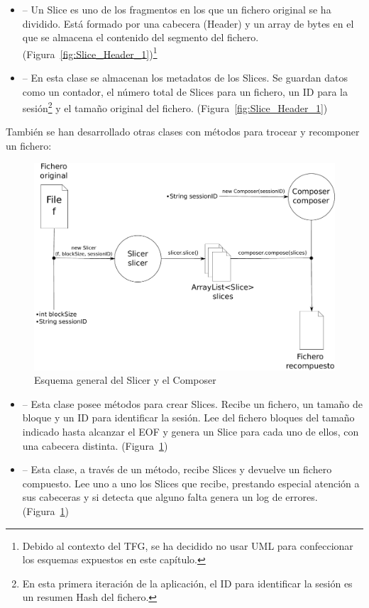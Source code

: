 \begin{itemize}
  \item {} -- Un Slice es uno de los fragmentos en los que un
  fichero original se ha dividido. Está formado por una cabecera (Header) y un
  array de bytes en el que se almacena el contenido del segmento del fichero.
  (Figura~\ref{fig:Slice_Header_1})\footnote{Debido al contexto del TFG, se ha
  decidido no usar UML para confeccionar los esquemas expuestos en este
  capítulo.}

  \item {} -- En esta clase se almacenan los metadatos de los
  Slices. Se guardan datos como un contador, el número total de Slices
  para un fichero, un ID para la sesión\footnote{En esta primera iteración de la
  aplicación, el ID para identificar la sesión es un resumen Hash del fichero.}
  y el tamaño original del fichero. (Figura~\ref{fig:Slice_Header_1})
\end{itemize}

También se han desarrollado otras clases con métodos para trocear y recomponer
un fichero:

\begin{figure}[!htb]
  \centering
  \includegraphics[scale=0.5]{Figures/Assembler}
  \decoRule
  \caption[Slicer - Composer]{Esquema general del Slicer y el Composer}
  \label{fig:Assembler}
\end{figure}

\begin{itemize}
  \item {} -- Esta clase posee métodos para crear Slices. Recibe
  un fichero, un tamaño de bloque y un ID para identificar la sesión. Lee del
  fichero bloques del tamaño indicado hasta alcanzar el EOF y genera un Slice
  para cada uno de ellos, con una cabecera distinta.
  (Figura~\ref{fig:Assembler})

  \item {} -- Esta clase, a través de un método, recibe Slices
  y devuelve un fichero compuesto. Lee uno a uno los Slices que recibe,
  prestando especial atención a sus cabeceras y si detecta que alguno falta
  genera un log de errores. (Figura~\ref{fig:Assembler})
\end{itemize}


